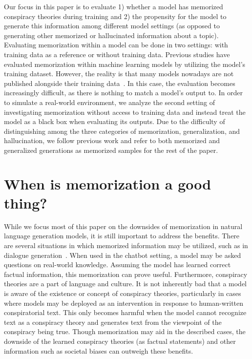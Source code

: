 \documentclass[11pt,a4paper]{article}
\begin{document}
Our focus in this paper is to evaluate 1) whether a model has memorized conspiracy theories during training and 2) the propensity for the model to generate this information among different model settings (as opposed to generating other memorized or hallucinated information about a topic). Evaluating memorization within a model can be done in two settings: with training data as a reference or without training data. Previous studies have evaluated memorization within machine learning models by utilizing the model's training dataset. However, the reality is that many models nowadays are not published alongside their training data~\cite{45189}. In this case, the evaluation becomes increasingly difficult, as there is nothing to match a model's output to. In order to simulate a real-world environment, we analyze the second setting of investigating memorization without access to training data and instead treat the model as a black box when evaluating its outputs. Due to the difficulty of distinguishing among the three categories of memorization, generalization, and hallucination, we follow previous work and refer to both memorized and generalized generations as memorized samples for the rest of the paper.

\section{When is memorization a good thing?}
While we focus most of this paper on the downsides of memorization in natural language generation models, it is still important to address the benefits. There are several situations in which memorized information may be utilized, such as in dialogue generation~\cite{gu-etal-2016-incorporating}. When used in the chatbot setting, a model may be asked questions on real-world knowledge. Assuming the model has learned correct factual information, this memorization can prove useful. Furthermore, conspiracy theories are a part of language and culture. It is not inherently bad that a model is aware of the existence or concept of conspiracy theories, particularly in cases where models may be deployed as an intervention in response to human-written conspiratorial text. This only becomes harmful when the model cannot recognize text as a conspiracy theory and generates text from the viewpoint of the conspiracy being true. Though memorization may aid in the described cases, the downside of the learned conspiracy theories (as factual statements) and other information such as societal biases can outweigh these benefits. 
 
\end{document}
